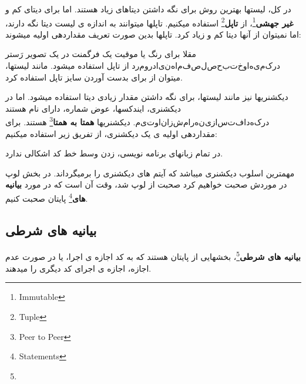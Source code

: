 \documentclass[14pt,a4paper]{memoir}
\begin{document}
 	 
	 در کل، لیستها بهترین روش برای نگه داشتن دیتاهای زیاد هستند. اما برای دیتای کم و \textbf{غیر جهشی}\footnote{Immutable}، از \textbf{تاپل}\footnote{Tuple} استفاده میکنیم.  تاپلها میتوانند به اندازه ی لیست دیتا نگه دارند، اما نمیتوان از آنها دیتا کم و زیاد کرد. تاپلها بدین صورت تعریف مقداردهی اولیه میشوند:
	 
	 
 	 	\begin{latin}
	
\end{latin}
	 مقلا برای رنگ یا موقیت یک فرگمنت در یک تصویر رَستر \(در مورد اینها مفصل صحبت خواهیم کرد\) از تاپل استفاده میشود. مانند لیستها، میتوان از  برای بدست آوردن سایز تاپل استفاده کرد.
	 
	 دیکشنریها نیز مانند لیستها، برای نگه داشتن مقدار زیادی دیتا استفاده میشود. اما در دیکشنری، ایندکسها، عوض شماره، دارای نام هستند \(میتوان از شماره نیز استفاده کرد\). دیکشنریها \textbf{همتا به همتا}\footnote{Peer to Peer} هستند. برای مقداردهی اولیه ی یک دیکشنری، از تفریق زیر استفاده میکنیم:
	 
	 \begin{latin}
	 	
	 \end{latin}
	 
	 \begin{tip}
	 	در تمام زبانهای برنامه نویسی، زدن \keys{\return}  وسط خط کد اشکالی ندارد.
	 \end{tip}
	 
	 
	 مهمترین اسلوب دیکشنری  میباشد که آیتم های دیکشنری را برمیگرداند. در بخش لوپ در موردش صحبت خواهیم کرد صحبت از لوپ شد، وقت آن است که در مورد \textbf{بیانیه های}\footnote{Statements} پایتان صحبت کنیم.
	 
	 \subsection{بیانیه های شرطی}\label{pyif}
	 
	 
	 \textbf{بیانیه های شرطی}\footnote{}، بخشهایی از پایتان هستند که به کد اجازه ی اجرا، یا در صورت عدم اجازه، اجازه ی اجرای کد دیگری را میدهند.
	 
\end{document}
